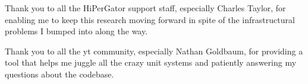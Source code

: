 Thank you to all the HiPerGator support staff, especially Charles Taylor, for enabling me to keep this research moving forward in spite of the infrastructural problems I bumped into along the way.


Thank you to all the yt community, especially Nathan Goldbaum, for providing a tool that helps me juggle all the crazy unit systems and patiently answering my questions about the codebase.

